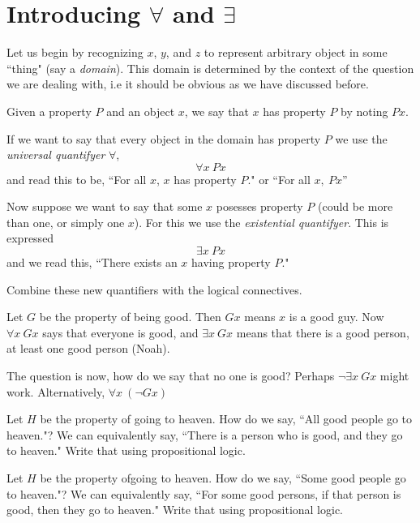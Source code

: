 \section{Introducing $\forall$ and $\exists$}
Let us begin by recognizing $x$, $y$, and $z$ to represent arbitrary object in some ``thing" (say a \emph{domain}).  This domain is determined by the context of the question we are dealing with, i.e it should be obvious as we have discussed before.

Given a property $P$ and an object $x$, we say that $x$ has property $P$ by noting $Px$.

If we want to say that every object in the domain has property $P$ we use the \emph{universal quantifyer} $\forall$, 
\[\forall x~ Px\]
and read this to be, ``For all $x$, $x$ has property $P$."  or ``For all $x,~ Px$''

Now suppose we want to say that some $x$ posesses property $P$ (could be more than one, or simply one $x$).   For this we use the \emph{existential quantifyer}.  This is expressed
\[\exists x~ Px\]
and we read this, ``There exists an $x$ having property $P$."

Combine these new quantifiers with the logical connectives.  
\begin{example}
Let $G$ be the property of being good.  Then $Gx$ means $x$ is a good guy.  Now $\forall x~Gx$ says that everyone is good, and $\exists x~Gx$ means that there is a good person, at least one good person (Noah).

The question is now, how do we say that no one is good?  Perhaps $\neg\exists x~Gx$ might work.  Alternatively, $\forall x~(\neg Gx)$  

\end{example}

\begin{example}
Let $H$ be the property of going to heaven.  How do we say, ``All good people go to heaven."?  We can equivalently say, ``There is a person who is good, and they go to heaven."   Write that using propositional logic.
\end{example}

\begin{example}
Let $H$ be the property ofgoing to heaven.  How do we say, ``Some good people go to heaven."?  We can equivalently say, ``For some good persons, if that person is good, then they go to heaven."   Write that using propositional logic.
\end{example}


